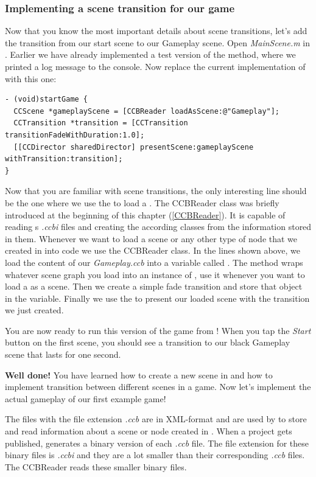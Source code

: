 \subsubsection{Implementing a scene transition for our game}
Now that you know the most important details about scene transitions, let's add
the transition from our start scene to our Gameplay scene. Open
\textit{MainScene.m} in \xcode{}. Earlier we have already implemented a test
version of the  method, where we printed a log message to
the console. Now replace the current implementation of 
with this one:
\begin{lstlisting}
- (void)startGame {
  CCScene *gameplayScene = [CCBReader loadAsScene:@"Gameplay"];
  CCTransition *transition = [CCTransition transitionFadeWithDuration:1.0];
  [[CCDirector sharedDirector] presentScene:gameplayScene withTransition:transition];
}
\end{lstlisting}
Now that you are familiar with scene transitions, the only interesting line
should be the one where we use the  to
load a \ccbfile{}. The CCBReader class was briefly introduced at the beginning
of this chapter (\ref{CCBReader}). It is capable of reading \SB{}s
\textit{.ccbi} files and creating the according \cocos{} classes from the
information stored in them. Whenever we want to load a scene or any
other type of node that we created in \SB{} into code we use the CCBReader
class. In the lines shown above, we load the content of our
\textit{Gameplay.ccb} into a variable called . The
 method wraps whatever scene graph you load into an
instance of , use it whenever you want to load a \ccbfile{}
as a scene. %
Then we create a simple fade transition and store that object in
the  variable. Finally we use the  to present our loaded scene with the transition we just created.

You are now ready to run this version of the game from \xcode{}! When you tap
the \textit{Start} button on the first scene, you should see a transition to our
black Gameplay scene that lasts for one second.

\textbf{Well done!} You have learned how to create a new scene in \SB{} and how
to implement transition between different scenes in a game. Now let's implement
the actual gameplay of our first example game!

\begin{details}[frametitle={.ccb and .ccbi}] 
The files with the file extension \textit{.ccb} are in XML-format and are used
by \SB{} to store and read information about a scene or node created in \SB{}.
When a \SB{} project gets published, \SB{} generates a binary version of
each \textit{.ccb} file. The file extension for these binary files is
\textit{.ccbi} and they are a lot smaller than their corresponding
\textit{.ccb} files. The CCBReader reads these smaller binary files.
\end{details}

